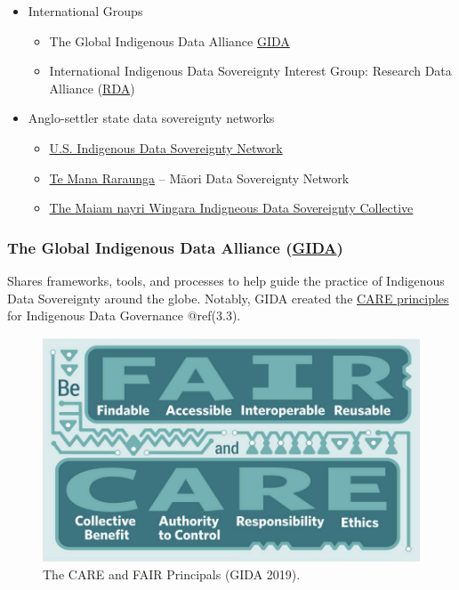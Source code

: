 \documentclass[
]{book}
\providecommand{\tightlist}{%
  \setlength{\itemsep}{0pt}\setlength{\parskip}{0pt}}
\begin{document}
\begin{itemize}
\tightlist
\item
  International Groups

  \begin{itemize}
  \tightlist
  \item
    The Global Indigenous Data Alliance \href{https://www.gida-global.org/}{GIDA}
  \item
    International Indigenous Data Sovereignty Interest Group: Research Data Alliance (\href{https://www.rd-alliance.org/groups/international-indigenous-data-sovereignty-ig}{RDA})
  \end{itemize}
\item
  Anglo-settler state data sovereignty networks

  \begin{itemize}
  \tightlist
  \item
    \href{https://usindigenousdata.org/}{U.S. Indigenous Data Sovereignty Network}
  \item
    \href{https://www.temanararaunga.maori.nz/}{Te Mana Raraunga} -- Māori Data Sovereignty Network
  \item
    \href{https://www.maiamnayriwingara.org/}{The Maiam nayri Wingara Indigneous Data Sovereignty Collective}
  \end{itemize}
\end{itemize}

\hypertarget{the-global-indigenous-data-alliance-gida}{%
\subsubsection*{\texorpdfstring{The Global Indigenous Data Alliance (\href{https://www.gida-global.org/}{GIDA})}{The Global Indigenous Data Alliance (GIDA)}}\label{the-global-indigenous-data-alliance-gida}}

Shares frameworks, tools, and processes to help guide the practice of Indigenous Data Sovereignty around the globe. Notably, GIDA created the \href{https://www.gida-global.org/care}{CARE principles} for Indigenous Data Governance @ref(3.3).

\begin{figure}
\includegraphics[width=12.44in]{images/care_fair} \caption{The CARE and FAIR Principals (GIDA 2019).}\label{fig:unnamed-chunk-7}
\end{figure}
\end{document}
